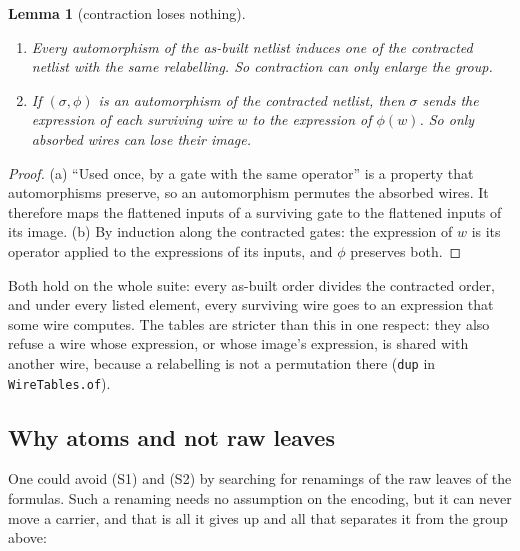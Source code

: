\documentclass[11pt,a4paper]{article}
\newtheorem{lemma}[theorem]{Lemma}
\theoremstyle{definition}
\theoremstyle{remark}
\newcommand{\code}[1]{\texttt{\small #1}}
\begin{document}
\begin{lemma}[contraction loses nothing]\label{lem:contract}
\begin{enumerate}[label=(\alph*),leftmargin=*,nosep]
\item Every automorphism of the as-built netlist induces one of the contracted netlist with the
  same relabelling.  So contraction can only enlarge the group.
\item If $(\sigma,\phi)$ is an automorphism of the contracted netlist, then $\sigma$ sends the
  expression of each surviving wire $w$ to the expression of $\phi(w)$.  So only absorbed wires
  can lose their image.
\end{enumerate}
\end{lemma}
\begin{proof}
(a) ``Used once, by a gate with the same operator'' is a property that automorphisms preserve,
so an automorphism permutes the absorbed wires.  It therefore maps the flattened inputs of a
surviving gate to the flattened inputs of its image.  (b) By induction along the contracted
gates: the expression of $w$ is its operator applied to the expressions of its inputs, and
$\phi$ preserves both.
\end{proof}

Both hold on the whole suite: every as-built order divides the contracted order, and under every
listed element, every surviving wire goes to an expression that some wire computes.  The tables
are stricter than this in one respect: they also refuse a wire whose expression, or whose image's
expression, is shared with another wire, because a relabelling is not a permutation there
(\code{dup} in \code{WireTables.of}).

\subsection{Why atoms and not raw leaves}\label{sec:whyatoms}

One could avoid (S1) and (S2) by searching for renamings of the raw leaves of the formulas.  Such a
renaming needs no assumption on the encoding, but it can never move a carrier, and that is all it
gives up and all that separates it from the group above:
\end{document}
